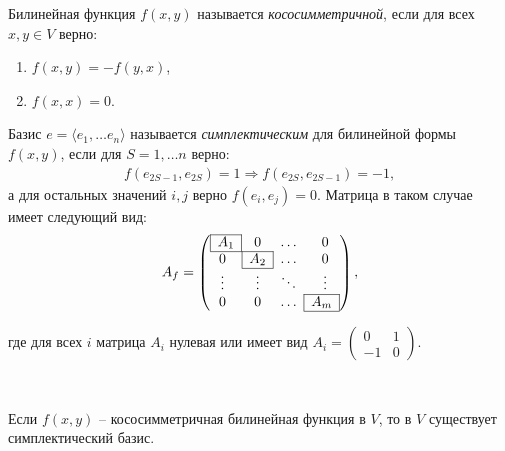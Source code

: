 \begin{reminder}
    Билинейная функция $f(x, y)$ называется \textit{кососимметричной}, если для всех $x, y \in V$ верно:
    \begin{enumerate}
        \item $f(x, y) = -f(y, x)$,
        \item $f(x, x) = 0$.
    \end{enumerate}
\end{reminder}

\begin{definition}
    Базис $e = \langle e_1, \dots e_n \rangle$ называется \textit{симплектическим} для билинейной формы $f(x, y)$, 
    если для $S = 1,\dots n$ верно:
    \begin{gather*}
        f(e_{2S - 1}, e_{2S}) = 1 \Rightarrow f(e_{2S}, e_{2S-1}) = -1,
    \end{gather*} а для остальных значений $i, j$ верно $f(e_i, e_j) = 0$. 
    Матрица в таком случае имеет следующий вид: 
    \[A_f = \left(\begin{array}{@{}cccc@{}}
		\cline{1-1}
		\multicolumn{1}{|c|}{A_1} & 0 & \dots & 0\\
		\cline{1-2}
		0 & \multicolumn{1}{|c|}{A_2} & \dots & 0\\
		\cline{2-2}
		\vdots & \vdots & \ddots & \vdots\\
		\cline{4-4}
		0 & 0 & \dots & \multicolumn{1}{|c|}{A_m}\\
		\cline{4-4}
	\end{array}\right),\]
	
	где для всех $i$ матрица $A_i$ нулевая или имеет вид $A_i = 
    \begin{pmatrix}
        0  &1 \\
		-1 &0
    \end{pmatrix}$.
\end{definition}

\begin{theorem}~

    Если $f(x, y)$ -- кососимметричная билинейная функция в $V$, то в $V$ существует симплектический базис.
\end{theorem}

